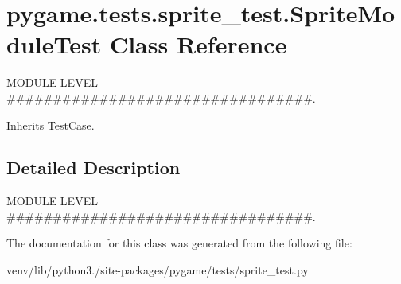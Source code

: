 \hypertarget{classpygame_1_1tests_1_1sprite__test_1_1_sprite_module_test}{}\section{pygame.\+tests.\+sprite\+\_\+test.\+Sprite\+Module\+Test Class Reference}
\label{classpygame_1_1tests_1_1sprite__test_1_1_sprite_module_test}


M\+O\+D\+U\+LE L\+E\+V\+EL \#\#\#\#\#\#\#\#\#\#\#\#\#\#\#\#\#\#\#\#\#\#\#\#\#\#\#\#\#\#\#\#\#.  




Inherits Test\+Case.



\subsection{Detailed Description}
M\+O\+D\+U\+LE L\+E\+V\+EL \#\#\#\#\#\#\#\#\#\#\#\#\#\#\#\#\#\#\#\#\#\#\#\#\#\#\#\#\#\#\#\#\#. 

The documentation for this class was generated from the following file\+:\begin{DoxyCompactItemize}
\item 
venv/lib/python3./site-\/packages/pygame/tests/sprite\+\_\+test.\+py\end{DoxyCompactItemize}

